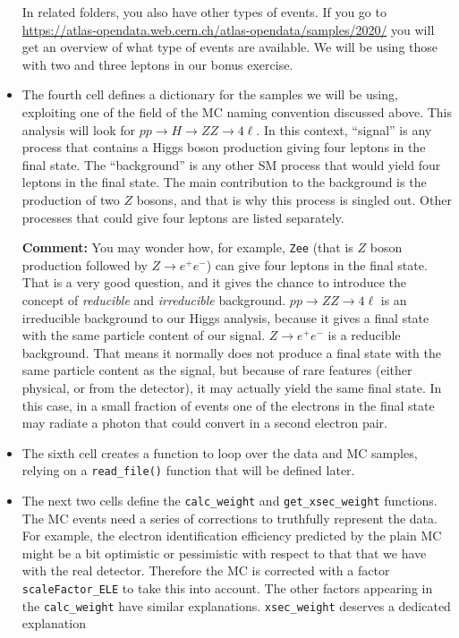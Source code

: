\begin{itemize}
In related folders, you also have other types of events. If you go to \url{https://atlas-opendata.web.cern.ch/atlas-opendata/samples/2020/} you will get an overview of what type of events are available. We will be using those with two and three leptons in our bonus exercise. 

\item The fourth cell defines a dictionary for the samples we will be using, exploiting one of the field of the MC naming convention discussed above. This analysis will look for $pp\rightarrow H\rightarrow ZZ\rightarrow 4\ell$. In this context, ``signal'' is any process that contains a Higgs boson production giving four leptons in the final state. The ``background'' is any other SM process that would yield four leptons in the final state. The main contribution to the background is the production of two $Z$ bosons, and that is why this process is singled out. Other processes that could give four leptons are listed separately.

\begin{mybox}
\textbf{Comment:} You may wonder how, for example, \verb|Zee| (that is $Z$ boson production followed by $Z\rightarrow e^+e^-$) can give four leptons in the final state. That is a very good question, and it gives the chance to introduce the concept of \textit{reducible} and \textit{irreducible} background. $pp\rightarrow ZZ \rightarrow 4 \ell$ is an irreducible background to our Higgs analysis, because it gives a final state with the same particle content of our signal. $Z\rightarrow e^+e^-$ is a reducible background. That means it normally does not produce a final state with the same particle content as the signal, but because of rare features (either physical, or from the detector), it may actually yield the same final state. In this case, in a small fraction of events one of the electrons in the final state may radiate a photon that could convert in a second electron pair. 
\end{mybox}

\item The sixth cell creates a function to loop over the data and MC samples, relying on a \verb|read_file()| function that will be defined later. 
\item The next two cells define the \verb|calc_weight| and \verb|get_xsec_weight| functions. The MC events need a series of corrections to truthfully represent the data. For example, the electron identification efficiency predicted by the plain MC might be a bit optimistic or pessimistic with respect to that that we have with the real detector. Therefore the MC is corrected with a factor \verb|scaleFactor_ELE| to take this into account. The other factors appearing in the \verb|calc_weight| have similar explanations. \verb|xsec_weight| deserves a dedicated explanation 


\end{itemize}
